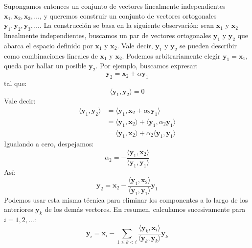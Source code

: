   Supongamos entonces un conjunto de vectores linealmente independientes
  \(\mathbf{x}_1, \mathbf{x}_2, \mathbf{x}_3, \dotsc\),
  y queremos construir un conjunto de vectores ortogonales
  \(\mathbf{y}_1, \mathbf{y}_2, \mathbf{y}_3, \dotsc\).
  La construcción se basa en la siguiente observación:
  sean \(\mathbf{x}_1\) y \(\mathbf{x}_2\) linealmente independientes,
  buscamos un par de vectores ortogonales \(\mathbf{y}_1\) y \(\mathbf{y}_2\)
  que abarca el espacio definido por \(\mathbf{x}_1\) y \(\mathbf{x}_2\).
  Vale decir,
  \(\mathbf{y}_1\) y \(\mathbf{y}_2\)
  se pueden describir como combinaciones lineales
  de \(\mathbf{x}_1\) y \(\mathbf{x}_2\).
  Podemos arbitrariamente elegir \(\mathbf{y}_1 = \mathbf{x}_1\),
  queda por hallar un posible \(\mathbf{y}_2\).
  Por ejemplo,
  buscamos expresar:
  \begin{equation*}
    \mathbf{y}_2
      = \mathbf{x}_2 + \alpha \mathbf{y}_1
  \end{equation*}
  tal que:
  \begin{equation*}
    \langle \mathbf{y}_1, \mathbf{y}_2 \rangle
      = 0
  \end{equation*}
  Vale decir:
  \begin{align*}
    \langle \mathbf{y}_1, \mathbf{y}_2 \rangle
      &= \langle \mathbf{y}_1, \mathbf{x}_2 + \alpha_2 \mathbf{y}_1 \rangle \\
      &= \langle \mathbf{y}_1, \mathbf{x}_2 \rangle
           + \langle \mathbf{y}_1, \alpha_2 \mathbf{y}_1 \rangle \\
      &= \langle \mathbf{y}_1, \mathbf{x}_2 \rangle
           + \alpha_2 \langle \mathbf{y}_1, \mathbf{y}_1 \rangle
  \end{align*}
  Igualando a cero,
  despejamos:
  \begin{equation*}
    \alpha_2
      = - \frac{\langle \mathbf{y}_1, \mathbf{x}_2 \rangle}
               {\langle \mathbf{y}_1, \mathbf{y}_1 \rangle}
  \end{equation*}
  Así:
  \begin{equation*}
    \mathbf{y}_2
      = \mathbf{x}_2
          - \frac{\langle \mathbf{y}_1, \mathbf{x}_2 \rangle}
                 {\langle \mathbf{y}_1, \mathbf{y}_1 \rangle} \mathbf{y}_1
  \end{equation*}
  Podemos usar esta misma técnica
  para eliminar los componentes a lo largo de los anteriores \(\mathbf{y}_k\)
  de los demás vectores.
  En resumen,
  calculamos sucesivamente para \(i = 1, 2, \dotsc\):
  \begin{equation*}
    \mathbf{y}_i
      = \mathbf{x}_i
          - \sum_{1 \le k < i}
              \frac{\langle \mathbf{y}_k, \mathbf{x}_i \rangle}
                   {\langle \mathbf{y}_k, \mathbf{y}_k \rangle} \mathbf{y}_k
  \end{equation*}



